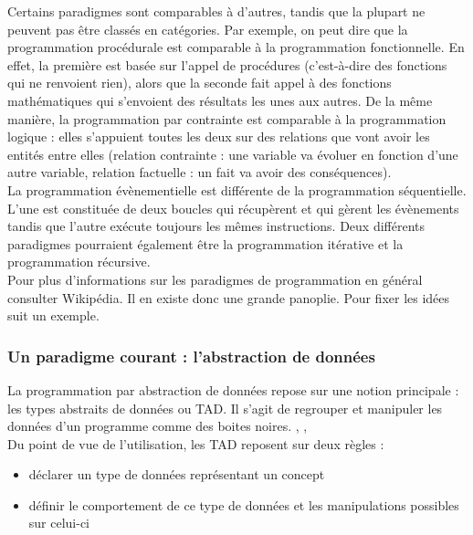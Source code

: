 Certains paradigmes sont comparables à d'autres, tandis que la plupart ne peuvent pas être classés en catégories. Par exemple, on peut dire que la programmation procédurale est comparable à la programmation fonctionnelle. En effet, la première est basée sur l'appel de procédures (c'est-à-dire des fonctions qui ne renvoient rien), alors que la seconde fait appel à des fonctions mathématiques qui s'envoient des résultats les unes aux autres. De la même manière, la programmation par contrainte est comparable à la programmation logique : elles s'appuient toutes les deux sur des relations que vont avoir les entités entre elles (relation contrainte : une variable va évoluer en fonction d'une autre variable, relation factuelle : un fait va avoir des conséquences).\\

La programmation évènementielle est différente de la programmation séquentielle. L'une est constituée de deux boucles qui récupèrent et qui gèrent les évènements tandis que l'autre exécute toujours les mêmes instructions. Deux différents paradigmes pourraient également être la programmation itérative et la programmation récursive.\\

Pour plus d'informations sur les paradigmes de programmation en général consulter Wikipédia. \cite{bib_wiki_paradigmes}
Il en existe donc une grande panoplie. Pour fixer les idées suit un exemple.

\subsubsection{Un paradigme courant : l'abstraction de données}

La programmation par abstraction de données repose sur une notion principale : les types abstraits de données ou TAD. Il s'agit de regrouper et manipuler les données d'un programme comme des boites noires. \cite{bib_dchaffiol1}, \cite{bib_dchaffiol2}, \cite{bib_wiki_adt}\\

Du point de vue de l'utilisation, les TAD reposent sur deux règles \cite{bib_reunion} :
\begin{itemize}
\item déclarer un type de données représentant un concept
\item définir le comportement de ce type de données et les manipulations possibles sur celui-ci\\
\end{itemize}

